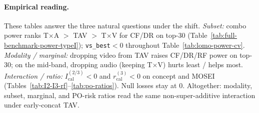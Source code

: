 \paragraph{Empirical reading.}
These tables answer the three natural questions under the shift.
\emph{Subset:} combo power ranks T$\times$A $>$ TAV $>$ T$\times$V for CF/DR on
top-30 (Table~\ref{tab:full-benchmark-power-typeI});
\texttt{vs\_best}$<0$ throughout Table~\ref{tab:lomo-power-cv}.
\emph{Modality / marginal:} dropping video from TAV raises CF/DR/RF power on
top-30; on the mid-band, dropping audio (keeping T$\times$V) hurts least /
helps most.
\emph{Interaction / ratio:} $I_{\mathrm{cal}}^{(2/3)}<0$ and
$r_{\mathrm{cal}}^{(3)}<0$ on concept and MOSEI
(Tables~\ref{tab:I2-I3-rf}--\ref{tab:po-ratios}).
Null losses stay at $0$.
Altogether: modality, subset, marginal, and PO-risk ratios read the same
non-super-additive interaction under early-concat TAV.
